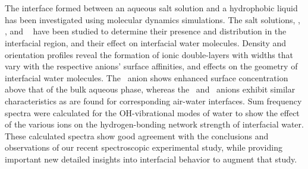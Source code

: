 \section*{}


The interface formed between an aqueous salt solution and a hydrophobic liquid has been investigated using molecular dynamics simulations. The salt solutions, \nacl, \sodnit, and \sodsul~ have been studied to determine their presence and distribution in the interfacial region, and their effect on interfacial water molecules. Density and orientation profiles reveal the formation of ionic double-layers with widths that vary with the respective anions' surface affinities, and effects on the geometry of interfacial water molecules. The \nit~anion shows enhanced surface concentration above that of the bulk aqueous phase, whereas the \cl~and \sul~anions exhibit similar characteristics as are found for corresponding air-water interfaces. Sum frequency spectra were calculated for the OH-vibrational modes of water to show the effect of the various ions on the hydrogen-bonding network strength of interfacial water. These calculated spectra show good agreement with the conclusions and observations of our recent spectroscopic experimental study, while providing important new detailed insights into interfacial behavior to augment that study.
